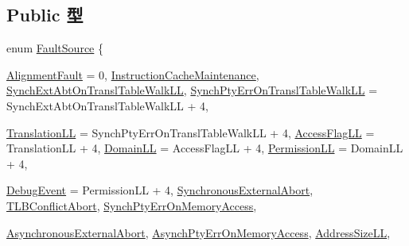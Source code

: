 \subsection*{Public 型}
\begin{DoxyCompactItemize}
\item 
enum \hyperlink{classArmISA_1_1ArmFault_a8771a605c5b916759188c3a191bb6202}{FaultSource} \{ \par
\hyperlink{classArmISA_1_1ArmFault_a8771a605c5b916759188c3a191bb6202a25751bcd8ec8d06a081be3218e856cc6}{AlignmentFault} =  0, 
\hyperlink{classArmISA_1_1ArmFault_a8771a605c5b916759188c3a191bb6202ad88fb6665c995c4aff3aac33695f436a}{InstructionCacheMaintenance}, 
\hyperlink{classArmISA_1_1ArmFault_a8771a605c5b916759188c3a191bb6202a2c9696f3e45f34637be8769e3f076f0c}{SynchExtAbtOnTranslTableWalkLL}, 
\hyperlink{classArmISA_1_1ArmFault_a8771a605c5b916759188c3a191bb6202a73f8efcb2cc36f81d5c33df5f1c9bd53}{SynchPtyErrOnTranslTableWalkLL} =  SynchExtAbtOnTranslTableWalkLL + 4, 
\par
\hyperlink{classArmISA_1_1ArmFault_a8771a605c5b916759188c3a191bb6202a36a8d822dd25492d60c859de5400455b}{TranslationLL} =  SynchPtyErrOnTranslTableWalkLL + 4, 
\hyperlink{classArmISA_1_1ArmFault_a8771a605c5b916759188c3a191bb6202a86a18fce3ed059dd524ccc7f8f337137}{AccessFlagLL} =  TranslationLL + 4, 
\hyperlink{classArmISA_1_1ArmFault_a8771a605c5b916759188c3a191bb6202a1b3eba46a3fdb576e660783538300d71}{DomainLL} =  AccessFlagLL + 4, 
\hyperlink{classArmISA_1_1ArmFault_a8771a605c5b916759188c3a191bb6202ac0886edcd2e7ae9ce6ce4161ca336205}{PermissionLL} =  DomainLL + 4, 
\par
\hyperlink{classArmISA_1_1ArmFault_a8771a605c5b916759188c3a191bb6202aadff4677cc8ab6ed2e52256c271e955b}{DebugEvent} =  PermissionLL + 4, 
\hyperlink{classArmISA_1_1ArmFault_a8771a605c5b916759188c3a191bb6202a9ea09f3eaeef5031d42156ce4cacdde3}{SynchronousExternalAbort}, 
\hyperlink{classArmISA_1_1ArmFault_a8771a605c5b916759188c3a191bb6202a644cdad9d0e40d88fd4760d5b9f122df}{TLBConflictAbort}, 
\hyperlink{classArmISA_1_1ArmFault_a8771a605c5b916759188c3a191bb6202a03582e93d4e784024e9dc0194f0ec975}{SynchPtyErrOnMemoryAccess}, 
\par
\hyperlink{classArmISA_1_1ArmFault_a8771a605c5b916759188c3a191bb6202ae9b68ca2d47d74817b5024c649c0c18c}{AsynchronousExternalAbort}, 
\hyperlink{classArmISA_1_1ArmFault_a8771a605c5b916759188c3a191bb6202aa632f13a72a303d4b5e2fc5ff134c4a5}{AsynchPtyErrOnMemoryAccess}, 
\hyperlink{classArmISA_1_1ArmFault_a8771a605c5b916759188c3a191bb6202ad3e0e83e6ccbaae6110e0312eb6a5280}{AddressSizeLL}, 

\end{DoxyCompactItemize}
